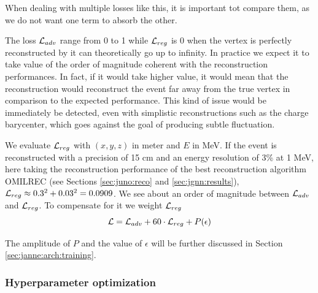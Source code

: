\documentclass[../main.tex]{subfiles}
\begin{document}
When dealing with multiple losses like this, it is important tot compare them, as we do not want one term to absorb the other.

The loss ${\cal L}_{adv}$ range from 0 to 1 while ${\cal L}_{reg}$ is 0 when the vertex is perfectly reconstructed by it can theoretically go up to infinity. In practice we expect it to take value of the order of magnitude coherent with the reconstruction performances. In fact, if it would take higher value, it would mean that the reconstruction would reconstruct the event far away from the true vertex in comparison to the expected performance. This kind of issue would be immediately be detected, even with simplistic reconstructions such as the charge barycenter, which goes against the goal of producing subtle fluctuation.

We evaluate ${\cal L}_{reg}$ with $(x, y, z)$ in meter and $E$ in MeV. If the event is reconstructed with a precision of 15 cm and an energy resolution of 3\% at 1 MeV, here taking the reconstruction performance of the best reconstruction algorithm OMILREC (see Sections \ref{sec:juno:reco} and \ref{sec:jgnn:results}), ${\cal L}_{reg} \approx 0.3^2 + 0.03^2 = 0.0909$. We see about an order of magnitude between ${\cal L}_{adv}$ and ${\cal L}_{reg}$. To compensate for it we weight ${\cal L}_{reg}$
\begin{equation}
  {\cal L} = {\cal L}_{adv} + 60\cdot{\cal L}_{reg} + P(\epsilon)
\end{equation}

The amplitude of $P$ and the value of $\epsilon$ will be further discussed in Section \ref{sec:janne:arch:training}.

\subsubsection{Hyperparameter optimization}
\end{document}
